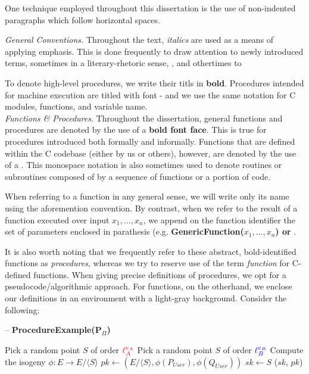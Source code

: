 One technique employed throughout this dissertation is the use of non-indented paragraphs which follow horizontal spaces. 

\noindent
\textit{General Conventions.} Throughout the text, \textit{italics} are used as a means of applying emphasis. This is done frequently to draw attention to newly introduced terms, sometimes in a literary-rhetoric sense, , and othertimes to 

To denote high-level procedures, we write their titls in \textbf{bold}. Procedures intended for machine execution are titled with  font - and we use the same notation for C modules, functions, and variable name.\\

\noindent
\textit{Functions \& Procedures}. Throughout the dissertation, general functions and procedures are denoted by the use of a \textbf{bold font face}. This is true for procedures introduced both formally and informally. Functions that are defined within the \sidh C codebase (either by us or others), however, are denoted by the use of a . This monospace notation is also sometimes used to denote routines or subroutines composed of by a sequence of functions or a portion of code. 

When referring to a function in any general sense, we will write only its name using the aforemention convention. By contrast, when we refer to the result of a function executed over input $x_{1}, ..., x_{n}$, we append on the function identifier the set of parameters enclosed in parathesis (e.g. \textbf{GenericFunction($x_{1}, ..., x_{n}$) or }. 

It is also worth noting that we frequently refer to these abstract, bold-identified functions as \textit{procedures}, whereas we try to reserve use of the term \textit{function} for C-defined \sidh functions. When giving precise definitions of procedures, we opt for a pseudocode/algorithmic approach. For functions, on the otherhand, we enclose our definitions in an environment with a light-gray background. Consider the following: \\

\begin{algorithm}
\caption{-- \textbf{ProcedureExample(\textbf{P}$_{\Pi}$)}}\label{alg:unruhconst}
\begin{algorithmic}[1]
	\State Pick a random point $S$ of order $\textcolor{red}{\ell_{A}^{e_A}}$
\EndIf
{}
	\State Pick a random point $S$ of order $\textcolor{blue}{\ell_{B}^{e_B}}$
\EndIf
\State Compute the isogeny $\phi: E \rightarrow E/\langle S \rangle$
\State $pk \gets (E/\langle S \rangle, \phi(P_{User}), \phi(Q_{User}))$
\State $sk \gets S$
\State \Return ($sk$, $pk$)
\end{algorithmic}
\end{algorithm}

